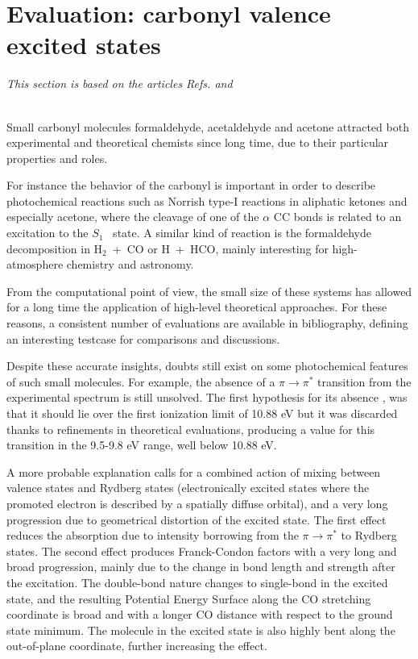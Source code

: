 \section{Evaluation: carbonyl valence excited states}

\begin{center}
\textit{This section is based on the articles Refs.  and
} \\
\end{center}
{\ }\\

Small carbonyl molecules formaldehyde, acetaldehyde and acetone attracted
both experimental and theoretical chemists since long time, due to their
particular properties and roles. 

For instance the behavior of the carbonyl is important in order to describe
photochemical reactions such as Norrish type-I reactions in aliphatic
ketones and especially acetone\cite{cpc-2-273-2001,noyes-prk,pps-3-6-2004},
where the cleavage of one of the $\alpha$ CC bonds is related to an
excitation to the $S_1$ \npi\  state.  A similar kind of reaction is the
formaldehyde decomposition in \mbox{H$_2$ + CO} or \mbox{H +
HCO}\cite{arpc-34-525-1983}, mainly interesting for high-atmosphere
chemistry and astronomy.  

From the computational point of view, the small size of these systems
has allowed for a long time the application of high-level theoretical
approaches.  For these reasons, a consistent number of evaluations are
available in bibliography, defining an interesting testcase for
comparisons and discussions.

Despite these accurate insights, doubts still exist on some
photochemical features of such small molecules. For example, the absence
of a $\pi \rightarrow \pi^{*}$ transition from the experimental spectrum is
still unsolved. The first hypothesis for its absence \cite{robin-hespm}, was
that it should lie over the first ionization limit of 10.88 eV
\cite{ijmsip-1-285-1968,jacs-94-1451-1972} but it was discarded thanks to
refinements in theoretical evaluations, producing a value for this
transition in the 9.5-9.8 eV range, well below 10.88 eV.

A more probable explanation calls for a combined action of mixing between
valence states and Rydberg states (electronically excited states where the
promoted electron is described by a spatially diffuse orbital), and a very
long progression due to geometrical distortion of the excited state.  The
first effect reduces the absorption due to intensity borrowing from the $\pi
\rightarrow \pi^{*}$ to Rydberg states. The second
effect produces Franck-Condon factors with a very long and broad
progression, mainly due to the change in bond length and strength after the
excitation.  The double-bond nature changes to single-bond in the excited
state, and the resulting Potential Energy Surface along the CO stretching
coordinate is broad and with a longer CO distance with respect to the ground
state minimum. The molecule in the excited state is also highly bent along
the out-of-plane coordinate, further increasing the effect.  

